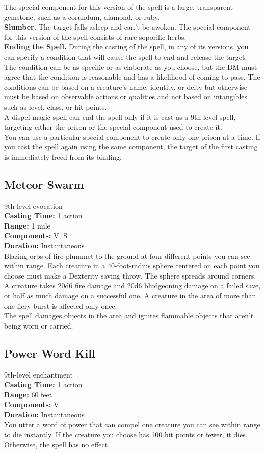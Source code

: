\documentclass[11pt, A4paper, english]{article}
\begin{document}
The special component for this version of the spell is a large, transparent gemstone, such as a corundum, diamond, or ruby. \\
\textbf{Slumber.} The target falls asleep and can’t be awoken. The special component for this version of the spell consists of rare soporific herbs. \\
\textbf{Ending the Spell.} During the casting of the spell, in any of its versions, you can specify a condition that will cause the spell to end and release the target. The condition can be as specific or as elaborate as you choose, but the DM must agree that the condition is reasonable and has a likelihood of coming to pass. The conditions can be based on a creature’s name, identity, or deity but otherwise must be based on observable actions or qualities and not based on intangibles such as level, class, or hit points. \\
A dispel magic spell can end the spell only if it is cast as a 9th-level spell, targeting either the prison or the special component used to create it. \\
You can use a particular special component to create only one prison at a time. If you cast the spell again using the same component, the target of the first casting is immediately freed from its binding.

		\subsection{Meteor Swarm}
9th-level evocation \\
\textbf{Casting Time:} 1 action \\
\textbf{Range:} 1 mile \\
\textbf{Components:} V, S \\
\textbf{Duration:} Instantaneous \\
Blazing orbs of fire plummet to the ground at four different points you can see within range. Each creature in a 40-foot-radius sphere centered on each point you choose must make a Dexterity saving throw. The sphere spreads around corners. A creature takes 20d6 fire damage and 20d6 bludgeoning damage on a failed save, or half as much damage on a successful one. A creature in the area of more than one fiery burst is affected only once. \\
The spell damages objects in the area and ignites flammable objects that aren’t being worn or carried.

		\subsection{Power Word Kill}
9th-level enchantment \\
\textbf{Casting Time:} 1 action \\
\textbf{Range:} 60 feet \\
\textbf{Components:} V \\
\textbf{Duration:} Instantaneous \\
You utter a word of power that can compel one creature you can see within range to die instantly. If the creature you choose has 100 hit points or fewer, it dies. Otherwise, the spell has no effect.
\end{document}
